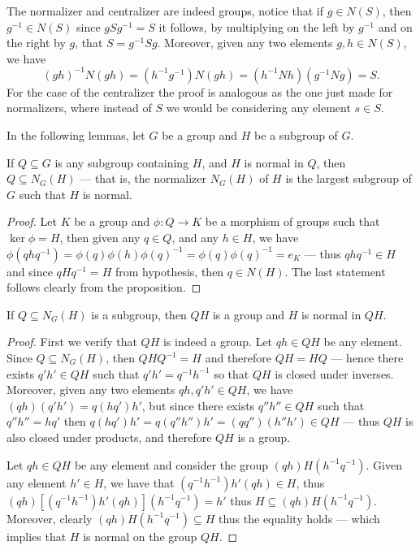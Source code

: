 The normalizer and centralizer are indeed groups, notice that if \(g \in N(S)\),
then \(g^{-1} \in N(S)\) since \(g S g^{-1} = S\) it follows, by multiplying on
the left by \(g^{-1}\) and on the right by \(g\), that \(S = g^{-1} S
g\). Moreover, given any two elements \(g, h \in N(S)\), we have
\[
  (g h)^{-1} N (g h) = (h^{-1} g ^{-1}) N (g h) = (h^{-1}N h) (g^{-1} N g) = S.
\]
For the case of the centralizer the proof is analogous as the one just made for
normalizers, where instead of \(S\) we would be considering any element \(s \in
S\).

In the following lemmas, let \(G\) be a group and \(H\) be a subgroup of \(G\).

\begin{lemma}
If \(Q \subseteq G\) is any subgroup containing \(H\), and \(H\) is normal in
\(Q\), then \(Q \subseteq N_G(H)\) --- that is, the normalizer \(N_G(H)\) of
\(H\) is the largest subgroup of \(G\) such that \(H\) is normal.
\end{lemma}

\begin{proof}
Let \(K\) be a group and \(\phi: Q \to K\) be a morphism of groups such that
\(\ker \phi = H\), then given any \(q \in Q\), and any \(h \in H\), we have
\(\phi(q h q^{-1}) = \phi(q) \phi(h) \phi(q)^{-1} = \phi(q) \phi(q)^{-1} = e_K\)
--- thus \(q h q^{-1} \in H\) and since \(q H q^{-1} = H\) from hypothesis, then
\(q \in N(H)\). The last statement follows clearly from the proposition.
\end{proof}

\begin{lemma}
If \(Q \subseteq N_G(H)\) is a subgroup, then \(Q H\) is a group and \(H\) is
normal in \(Q H\).
\end{lemma}

\begin{proof}
First we verify that \(Q H\) is indeed a group. Let \(q h \in Q H\) be any
element. Since \(Q \subseteq N_G(H)\), then \(Q H Q^{-1} = H\) and therefore \(Q
H = H Q\) --- hence there exists \(q' h' \in Q H\) such that \(q' h' = q^{-1}
h^{-1}\) so that \(Q H\) is closed under inverses. Moreover, given any two
elements \(q h, q' h' \in Q H\), we have \((q h)(q' h') = q (h q') h'\), but
since there exists \(q'' h'' \in Q H\) such that \(q'' h'' = h q'\) then \(q(h
q') h' = q (q'' h'') h' = (q q'') (h'' h') \in Q H\) --- thus \(Q H\) is also
closed under products, and therefore \(Q H\) is a group.

Let \(q h \in Q H\) be any element and consider the group \((q h) H (h^{-1}
q^{-1})\). Given any element \(h' \in H\), we have that \((q^{-1} h^{-1}) h' (q
h) \in H\), thus \((q h) [(q^{-1} h^{-1}) h' (q h)] (h^{-1} q ^{-1}) = h'\) thus
\(H \subseteq (q h) H (h^{-1} q^{-1})\). Moreover, clearly \((q h) H (h^{-1}
q^{-1}) \subseteq H\) thus the equality holds --- which implies that \(H\) is
normal on the group \(Q H\).
\end{proof}

